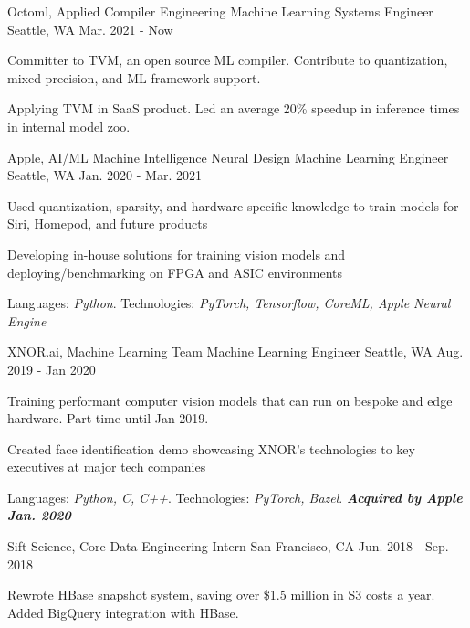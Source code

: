 \begin{cventries}
    \vspace{-0.6em}
  \cventry
    {Octoml, Applied Compiler Engineering}
    {Machine Learning Systems Engineer}
    {Seattle, WA}
    {Mar. 2021 - Now}
    {
      \begin{cvitems}
        \item {Committer to TVM, an open source ML compiler. Contribute to quantization, mixed precision, and ML framework support.}
        \item {Applying TVM in SaaS product. Led an average 20\% speedup in inference times in internal model zoo.}
	\vspace{-1em}
      \end{cvitems}
    }
   
 
  \cventry
    {Apple, AI/ML Machine Intelligence Neural Design}
    {Machine Learning Engineer}
    {Seattle, WA}
    {Jan. 2020 - Mar. 2021}
    {
      \begin{cvitems}
        \item {Used quantization, sparsity, and hardware-specific knowledge to train models for Siri, Homepod, and future products}
        \item {Developing in-house solutions for training vision models and deploying/benchmarking on FPGA and ASIC environments}
        \item {Languages: \textit{Python}. Technologies: \textit{PyTorch, Tensorflow, CoreML, Apple Neural Engine}}
	\vspace{-1em}
      \end{cvitems}
    }

  \cventry
    {XNOR.ai, Machine Learning Team}
    {Machine Learning Engineer}
    {Seattle, WA}
    {Aug. 2019 - Jan 2020}
    {
      \begin{cvitems}
        \item {Training performant computer vision models that can run on bespoke and edge hardware. Part time until Jan 2019.}
        \item {Created face identification demo showcasing XNOR's technologies to key executives at major tech companies} 
        \item {Languages: \textit{Python, C, C++}. Technologies: \textit{PyTorch, Bazel}. \textbf{\textit{Acquired by Apple Jan. 2020}}}
	\vspace{-1em}
      \end{cvitems}
    }

  \cventry
    {Sift Science, Core Data}
    {Engineering Intern}
    {San Francisco, CA}
    {Jun. 2018 - Sep. 2018}
    {
      \begin{cvitems}
        \item {Rewrote HBase snapshot system, saving over \$1.5 million in S3 costs a year. Added BigQuery integration with HBase.}
      \end{cvitems}
    }


\end{cventries}
